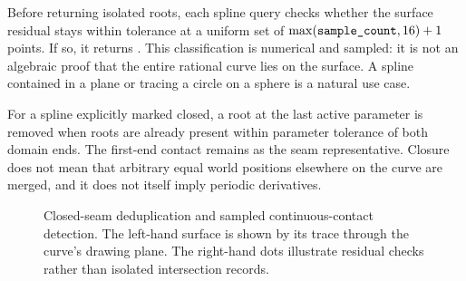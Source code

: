 Before returning isolated roots, each spline query checks whether the surface
residual stays within tolerance at a uniform set of
$\max(\api{sample_count},16)+1$ points. If so, it returns .
This classification is numerical and sampled: it is not an algebraic proof
that the entire rational curve lies on the surface. A spline contained in a
plane or tracing a circle on a sphere is a natural use case.

For a spline explicitly marked closed, a root at the last active parameter is
removed when roots are already present within parameter tolerance of both
domain ends. The first-end contact remains as the seam representative. Closure
does not mean that arbitrary equal world positions elsewhere on the curve are
merged, and it does not itself imply periodic derivatives.

\begin{figure}[htbp]
\centering
{}
\caption{Closed-seam deduplication and sampled continuous-contact detection.
The left-hand surface is shown by its trace through the curve's drawing
plane. The right-hand dots illustrate residual checks rather than isolated
intersection records.}
\label{fig:seam-coincidence}
\end{figure}

